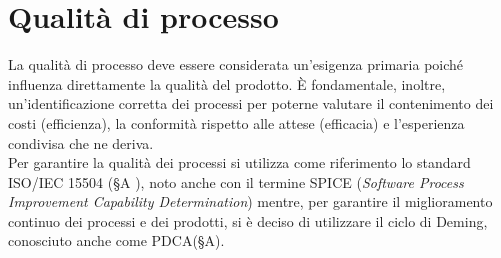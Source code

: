 \section{Qualità di processo}
La qualità di processo deve essere considerata un'esigenza primaria poiché influenza direttamente la qualità del prodotto. È fondamentale, inoltre, un'identificazione corretta dei processi per poterne valutare il contenimento dei costi (efficienza), la conformità rispetto alle attese (efficacia) e l'esperienza condivisa che ne deriva. \\
Per garantire la qualità dei processi si utilizza come riferimento lo standard ISO/IEC 15504 (§A ), noto anche con il termine SPICE (\textit{Software Process Improvement Capability Determination}) mentre, per garantire il miglioramento continuo dei processi e dei prodotti, si è deciso di utilizzare il ciclo di Deming, conosciuto anche come PDCA(§A).



